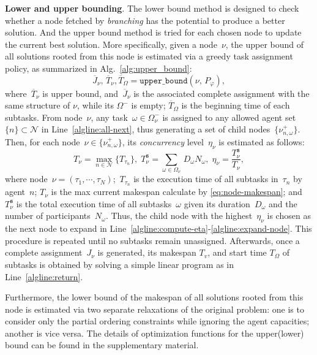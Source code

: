 \textbf{Lower and upper bounding}.
The lower bound method is designed to check whether a node fetched by \emph{branching}
has the potential to produce a better solution.
And the upper bound method is tried for each chosen node to update
 the current best solution.
More specifically, given a node~$\nu$,
the upper bound of all solutions rooted from this node
is estimated via a greedy task assignment policy,
as summarized in Alg.~\ref{alg:upper_bound}:
\begin{equation}\label{eq:upper-bound}
\overline{J}_\nu,\, \overline{T}_\nu ,\overline{T}_\Omega= \texttt{upper\_bound}(\nu,\, P_{\varphi}),
\end{equation}
{where~$\overline{T}_\nu$ is upper bound, and~$\overline{J}_\nu$ is the
associated complete assignment with the same structure of $\nu$, while its $\Omega^-$ is empty; $\overline{T}_\Omega$ is the beginning time
of each subtasks.}
From node~$\nu$, any task~$\omega\in \Omega^-_\nu$ is assigned
to any allowed agent set~$\{n\}\subset\mathcal{N}$ in Line~\ref{algline:all-next},
thus generating a set of child nodes~$\{\nu^+_{n,\omega}\}$.
Then, for each node~$\nu\in \{\nu^+_{n,\omega}\}$,
its \emph{concurrency} level~$\eta_{\nu}$ is estimated as follows:
\begin{equation}\label{eq:node-makespan}
T_\nu = \max_{n\in\mathcal{N}} \{T_{\tau_n}\},\;
T^{\texttt{s}}_\nu = \sum_{\omega\in\Omega_\nu}\, D_{\omega}N_\omega,\;
\eta_\nu = \frac{T^{\texttt{s}}_\nu}{T_\nu},
\end{equation}
where node~$\nu=(\tau_1,\cdots,\tau_N)$;~$T_{\tau_n}$ is the execution
time of all subtasks in~$\tau_n$ by agent~$n$;
$T_\nu$ is the max current makespan calculate by \eqref{eq:node-makespan};
and $T^{\texttt{s}}_\nu$ is the total execution time of all subtasks~$\omega$
given its duration~$D_\omega$ and the number of participants~$N_\omega$.
Thus, the child node with the highest~$\eta_{\nu}$ is chosen as
the next node to expand in Line~\ref{algline:compute-eta}-\ref{algline:expand-node}.
This procedure is repeated until no subtasks remain unassigned.
Afterwards, once a complete assignment~$J_\nu$ is generated, its makespan $T_v$, and start time $T_\Omega$ of subtasks is obtained by
solving a simple linear program as in Line~\ref{algline:return}.

Furthermore, the lower bound of the makespan of all solutions rooted from this
node is estimated via two separate relaxations of the original problem:
one is to consider only the partial ordering constraints while ignoring
the agent capacities;
another is vice versa. The details of optimization functions for the upper(lower) bound 
can be found in the supplementary material.


